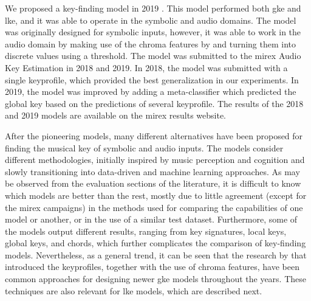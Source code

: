 We proposed a key-finding model in 2019
\parencite{napoleslopez2019keyfinding}. This model performed
both \gls{gke} and \gls{lke}, and it was able to operate in
the symbolic and audio domains. The model was originally
designed for symbolic inputs, however, it was able to work
in the audio domain by making use of the chroma features by
\textcite{mauch2010approximate} and turning them into
discrete values using a threshold. The model was submitted
to the \gls{mirex} Audio Key Estimation in 2018 and 2019. In
2018, the model was submitted with a single
\gls{keyprofile}, which provided the best generalization in
our experiments. In 2019, the model was improved by adding a
meta-classifier which predicted the global key based on the
predictions of several \gls{keyprofile}. The results of the
2018
and
2019
models are available on the \gls{mirex} results website.

After the pioneering models, many different alternatives
have been proposed for finding the musical key of symbolic
and audio inputs. The models consider different
methodologies, initially inspired by music perception and
cognition and slowly transitioning into data-driven and
machine learning approaches. As may be observed from the
evaluation sections of the literature, it is difficult to
know which models are better than the rest, mostly due to
little agreement (except for the \gls{mirex} campaigns) in
the methods used for comparing the capabilities of one model
or another, or in the use of a similar test dataset.
Furthermore, some of the models output different results,
ranging from key signatures, local keys, global keys, and
chords, which further complicates the comparison of
key-finding models. Nevertheless, as a general trend, it can
be seen that the research by \textcite{krumhansl1982tracing}
that introduced the \gls{keyprofile}s, together with the use
of chroma features, have been common approaches for
designing newer \gls{gke} models throughout the years. These
techniques are also relevant for \gls{lke} models, which are
described next.
